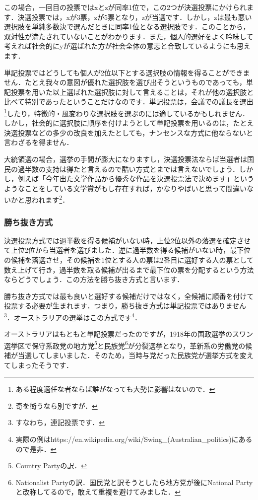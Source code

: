 この場合，一回目の投票ではxとzが同率1位で，この2つが決選投票にかけられます．決選投票では，xが3票，zが5票となり，zが当選です．しかし，zは最も悪い選択肢を単純多数決で選んだときに同率1位となる選択肢です．このことから，双対性が満たされていないことがわかります．また，個人的選好をよく吟味して考えれば社会的にyが選ばれた方が社会全体の意志と合致しているようにも思えます．

単記投票ではどうしても個人が2位以下とする選択肢の情報を得ることができません．たとえ我々の意図が優れた選択肢を選び出そうというものであっても，単記投票を用いた以上選ばれた選択肢に対して言えることは，それが他の選択肢と比べて特別であったということだけなのです．単記投票は，会議での議長を選出\footnote{ある程度適任な者ならば誰がなっても大勢に影響はないので．}したり，特徴的・風変わりな選択肢を選ぶのには適しているかもしれません．しかし，社会的に選択肢に順序を付けようとして単記投票を用いるのは，たとえ決選投票などの多少の改良を加えたとしても，ナンセンスな方式に他ならないと言わざるを得ません．

大統領選の場合，選挙の手間が膨大になりますし，決選投票法ならば当選者は国民の過半数の支持は得たと言えるので酷い方式とまでは言えないでしょう．しかし，例えば「今年出た文学作品から優秀な作品を決選投票法で決めます」というようなことをしている文学賞がもし存在すれば，かなりやばいと思って間違いないかと思われます\footnote{奇を衒うなら別ですが．}．

\subsubsection*{勝ち抜き方式}
決選投票方式では過半数を得る候補がいない時，上位2位以外の落選を確定させて上位2位から当選者を選びました．逆に過半数を得る候補がいない時，最下位の候補を落選させ，その候補を1位とする人の票は2番目に選好する人の票として数え上げて行き，過半数を取る候補が出るまで最下位の票を分配するという方法ならどうでしょう．この方法を勝ち抜き方式と言います．

勝ち抜き方式では最も良いと選好する候補だけではなく，全候補に順番を付けて投票する必要が生まれます．つまり，勝ち抜き方式は単記投票ではありません\footnote{すなわち，連記投票です．}．オーストラリアの選挙はこの方式です\footnote{実際の例はhttps://en.wikipedia.org/wiki/Swing\_(Australian\_politics)にあるので是非．}．

オーストラリアはもともと単記投票だったのですが，1918年の国政選挙のスワン選挙区で保守系政党の地方党\footnote{Country Partyの訳．}と民族党\footnote{Nationalist Partyの訳．国民党と訳そうとしたら地方党が後にNational Partyと改称してるので，敢えて重複を避けてみました．}が分裂選挙となり，革新系の労働党の候補が当選してしまいました．そのため，当時与党だった民族党が選挙方式を変えてしまったそうです．

